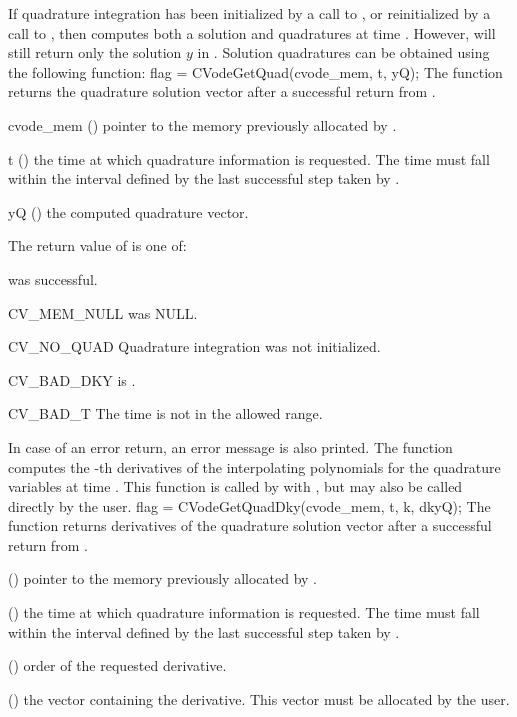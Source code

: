 If quadrature integration has been initialized by a call to ,
or reinitialized by a call to , then {\cvodes} computes both a solution
and quadratures at time . However,  will still return only the solution
$y$ in . Solution quadratures can be obtained using the following function:
{
  flag = CVodeGetQuad(cvode\_mem, t, yQ);
}
{
  The function  returns the quadrature solution vector after a
  successful return from .
}
{
  \begin{args}
  \item[cvode\_mem] ()
    pointer to the memory previously allocated by .
  \item[t] ()
    the time at which quadrature information is 
    requested. The time  must fall within the interval defined by the last 
    successful step taken by {\cvodes}.
  \item[yQ] ()
    the computed quadrature vector.
  \end{args}
}
{
  The return value  of  is one of:
  \begin{args}
  \item[\Id{CV\_SUCCESS}] 
     was successful.
  \item[CV\_MEM\_NULL] 
     was NULL.
  \item[CV\_NO\_QUAD] 
    Quadrature integration was not initialized.
  \item[CV\_BAD\_DKY] 
     is .
  \item[CV\_BAD\_T] 
    The time  is not in the allowed range.
  \end{args}
}
{
  In case of an error return, an error message is also printed.  
}
The function  computes the -th derivatives of the interpolating 
polynomials for the quadrature variables at time .
This function is called by  with , but may also be called 
directly by the user.
{
  flag = CVodeGetQuadDky(cvode\_mem, t, k, dkyQ);
}
{
  The function  returns derivatives of the quadrature solution 
  vector after a successful return from .
}
{
  \begin{args}
  \item[\id{cvode\_mem}] ()
    pointer to the memory previously allocated by .
  \item[\id{t}] ()
    the time at which quadrature information is 
    requested. The time  must fall within the interval defined by the last 
    successful step taken by {\cvodes}.
  \item[\id{k}] () order of the requested derivative.
  \item[\id{dkyQ}] ()
    the vector containing the derivative. This vector must be allocated by the user. 
  \end{args}
}
